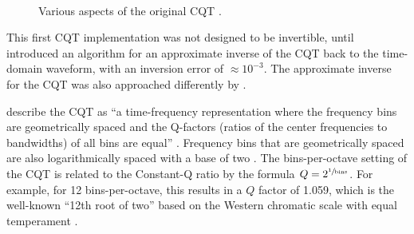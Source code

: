 \documentclass[report.tex]{subfiles}
\begin{document}
\begin{figure}[ht]
	\centering
	\\
	\caption{Various aspects of the original CQT \parencite[427, 428]{jbrown}.}
	\label{fig:jbrowncqt}
\end{figure}

This first CQT implementation was not designed to be invertible, until \textcite{klapuricqt} introduced an algorithm for an approximate inverse of the CQT back to the time-domain waveform, with an inversion error of $\approx 10^{-3}$. The approximate inverse for the CQT was also approached differently by \textcite{fitzgeraldcqt}.

\citeauthor{klapuricqt} describe the CQT as ``a time-frequency representation where the frequency bins are geometrically spaced and the Q-factors (ratios of the center frequencies to bandwidths) of all bins are equal'' \parencite[1]{klapuricqt}. Frequency bins that are geometrically spaced are also logarithmically spaced with a base of two \parencite{geometriclog}. The bins-per-octave setting of the CQT is related to the Constant-Q ratio by the formula $Q = 2^{\sfrac{1}{\text{bins}}}$. For example, for 12 bins-per-octave, this results in a $Q$ factor of 1.059, which is the well-known ``12th root of two'' based on the Western chromatic scale with equal temperament \parencite{westernpitch1, westernpitch2}.
\end{document}
